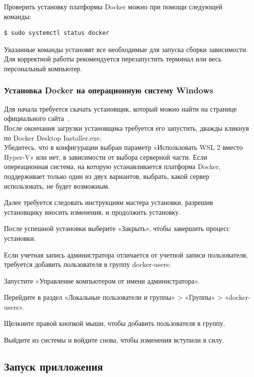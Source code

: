 Проверить установку платформы Docker можно при помощи следующей команды:

\begin{lstlisting}[basicstyle=\ttfamily\small]
$ sudo systemctl status docker
\end{lstlisting}

Указанные команды установят все необходимые для запуска сборки зависимости.
Для корректной работы рекомендуется перезапустить терминал или весь персональный компьютер.

\subsubsection{Установка Docker на операционную систему Windows}

Для начала требуется скачать установщик, который можно найти на странице официального сайта~\cite{docker_download}.
\\
После окончания загрузки установщика требуется его запустить, дважды кликнув по Docker Desktop Installer.exe.
\\
Убедитесь, что в конфигурации выбран параметр «Использовать WSL 2 вместо Hyper-V» или нет, в зависимости от выбора серверной части.
Если опереационная система, на которую устанавливается платформа Docker, поддерживает только один из двух вариантов,
выбрать, какой сервер использовать, не будет возможным.

Далее требуется следовать инструкциям мастера установки, разрешив установщику вносить изменения, и продолжить установку.

После успешной установки выберите «Закрыть», чтобы завершить процесс установки.

Если учетная запись администратора отличается от учетной записи пользователя, требуется добавить пользователя в группу docker-users:
\begin{enumerate_num}
    \item Запустите «Управление компьютером от имени администратора».
    \item Перейдите в раздел «Локальные пользователи и группы» > «Группы» > «docker-users».
    \item Щелкните правой кнопкой мыши, чтобы добавить пользователя в группу.
    \item Выйдите из системы и войдите снова, чтобы изменения вступили в силу.
\end{enumerate_num}

\subsection{Запуск прилложения}

